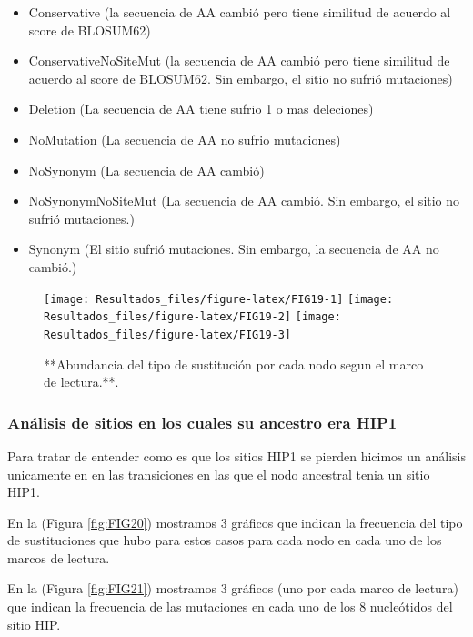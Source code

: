 \documentclass[
]{book}
\providecommand{\tightlist}{%
  \setlength{\itemsep}{0pt}\setlength{\parskip}{0pt}}
\begin{document}
\begin{itemize}
\tightlist
\item
  Conservative (la secuencia de AA cambió pero tiene similitud de acuerdo al score de BLOSUM62)
\item
  ConservativeNoSiteMut (la secuencia de AA cambió pero tiene similitud de acuerdo al score de BLOSUM62. Sin embargo, el sitio no sufrió mutaciones)
\item
  Deletion (La secuencia de AA tiene sufrio 1 o mas deleciones)
\item
  NoMutation (La secuencia de AA no sufrio mutaciones)
\item
  NoSynonym (La secuencia de AA cambió)
\item
  NoSynonymNoSiteMut (La secuencia de AA cambió. Sin embargo, el sitio no sufrió mutaciones.)
\item
  Synonym (El sitio sufrió mutaciones. Sin embargo, la secuencia de AA no cambió.)
\end{itemize}

\begin{figure}

{\centering \texttt{[image: Resultados\_files/figure-latex/FIG19-1]} \texttt{[image: Resultados\_files/figure-latex/FIG19-2]} \texttt{[image: Resultados\_files/figure-latex/FIG19-3]} 

}

\caption{**Abundancia del tipo de sustitución por cada nodo segun el marco de lectura.**.}\label{fig:FIG19}
\end{figure}

\hypertarget{anuxe1lisis-de-sitios-en-los-cuales-su-ancestro-era-hip1}{%
\subsubsection{Análisis de sitios en los cuales su ancestro era HIP1}\label{anuxe1lisis-de-sitios-en-los-cuales-su-ancestro-era-hip1}}

Para tratar de entender como es que los sitios HIP1 se pierden hicimos un análisis unicamente en en las transiciones en las que el nodo ancestral tenia un sitio HIP1.

En la (Figura \ref{fig:FIG20}) mostramos 3 gráficos que indican la frecuencia del tipo de sustituciones que hubo para estos casos para cada nodo en cada uno de los marcos de lectura.

En la (Figura \ref{fig:FIG21}) mostramos 3 gráficos (uno por cada marco de lectura) que indican la frecuencia de las mutaciones en cada uno de los 8 nucleótidos del sitio HIP.
\end{document}
